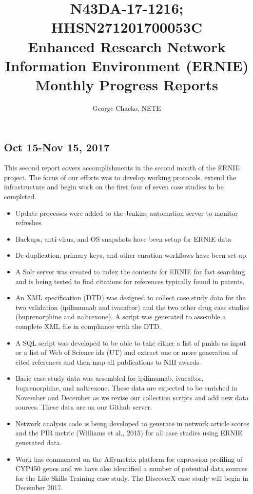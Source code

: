 \documentclass[11pt, oneside]{article}   	%
\title{N43DA-17-1216; HHSN271201700053C \\
Enhanced Research Network Information Environment (ERNIE)\\
Monthly Progress Reports}
\author{George Chacko, NETE}
\date{}							%
\begin{document}
\maketitle
\subsection*{Oct 15-Nov 15, 2017}

This second report covers accomplishments in the second month of the ERNIE project. The focus of our efforts was to develop working protocols, extend the infrastructure and begin work on the first four of seven case studies to be completed.

\begin{itemize}
\item Update processes were added to the Jenkins automation server to monitor refreshes
\item Backups, anti-virus, and OS snapshots have been setup for ERNIE data
\item De-duplication, primary keys, and other curation workflows have been set up.
\item A Solr server was created to index the contents for ERNIE for fast searching and is being tested to find citations for references typically found in patents.
\item An XML specification (DTD) was designed to collect case study data for the two validation (ipilimumab and ivacaftor) and the two other drug case studies (buprenorphine and naltrexone). A script was generated to assemble a complete XML file in compliance with the DTD.
\item A SQL script was developed to be able to take either a list of pmids as input or a list of Web of Science ids (UT) and extract one or more generation of cited references and then map all publications to NIH awards.
\item Basic case study data was assembled for ipilimumab, ivacaftor, buprenorphine, and naltrexone. These data are expected to be enriched in November and December as we revise our collection scripts and add new data sources. These data are on our Github server.
\item Network analysis code is being developed to generate in network article scores and the PIR metric (Williams et al., 2015) for all case studies using ERNIE generated data.
\item Work has commenced on the Affymetrix platform for expression profiling of CYP450 genes and we have also identified a number of potential data sources for the Life Skills Training case study. The DiscoverX case study will begin in December 2017.
\end{itemize}
\end{document}
